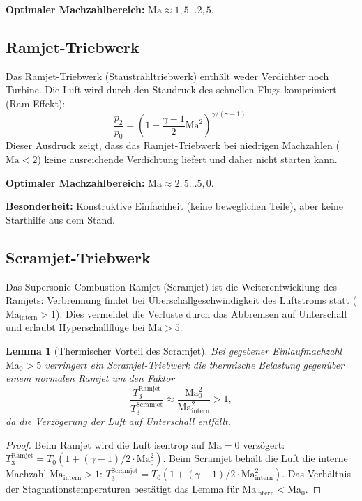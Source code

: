 ﻿\documentclass[12pt,a4paper]{article}
\newtheorem{lemma}[theorem]{Lemma}
\theoremstyle{remark}
\newcommand{\Ma}{\mathrm{Ma}}
\begin{document}
\textbf{Optimaler Machzahlbereich:} $\Ma \approx 1{,}5 \ldots 2{,}5$.

\subsection{Ramjet-Triebwerk}

Das Ramjet-Triebwerk (Staustrahltriebwerk) enth\"alt weder Verdichter noch Turbine.
Die Luft wird durch den Staudruck des schnellen Flugs komprimiert (Ram-Effekt):
\begin{equation}
  \frac{p_2}{p_0} = \left(1 + \frac{\gamma-1}{2}\Ma^2\right)^{\gamma/(\gamma-1)}.
  \label{eq:ram_pressure}
\end{equation}
Dieser Ausdruck zeigt, dass das Ramjet-Triebwerk bei niedrigen Machzahlen
($\Ma < 2$) keine ausreichende Verdichtung liefert und daher nicht starten kann.

\textbf{Optimaler Machzahlbereich:} $\Ma \approx 2{,}5 \ldots 5{,}0$.

\textbf{Besonderheit:} Konstruktive Einfachheit (keine beweglichen Teile),
aber keine Starthilfe aus dem Stand.

\subsection{Scramjet-Triebwerk}

Das Supersonic Combustion Ramjet (Scramjet) ist die Weiterentwicklung des Ramjets:
Verbrennung findet bei Überschallgeschwindigkeit des Luftstroms statt ($\Ma_{\mathrm{intern}} > 1$).
Dies vermeidet die Verluste durch das Abbremsen auf Unterschall
und erlaubt Hyperschallfl\"uge bei $\Ma > 5$.

\begin{lemma}[Thermischer Vorteil des Scramjet]
\label{lem:scramjet}
Bei gegebener Einlaufmachzahl $\Ma_0 > 5$ verringert ein Scramjet-Triebwerk
die thermische Belastung gegen\"uber einem normalen Ramjet um den Faktor
\[
  \frac{T_3^{\mathrm{Ramjet}}}{T_3^{\mathrm{Scramjet}}} \approx \frac{\Ma_0^2}{\Ma_{\mathrm{intern}}^2} > 1,
\]
da die Verz\"ogerung der Luft auf Unterschall entf\"allt.
\end{lemma}
\begin{proof}
Beim Ramjet wird die Luft isentrop auf $\Ma = 0$ verz\"ogert:
$T_3^{\mathrm{Ramjet}} = T_0 (1 + (\gamma-1)/2 \cdot \Ma_0^2)$.
Beim Scramjet beh\"alt die Luft die interne Machzahl $\Ma_{\mathrm{intern}} > 1$:
$T_3^{\mathrm{Scramjet}} = T_0 (1 + (\gamma-1)/2 \cdot \Ma_{\mathrm{intern}}^2)$.
Das Verh\"altnis der Stagnationstemperaturen best\"atigt das Lemma f\"ur $\Ma_{\mathrm{intern}} < \Ma_0$.
\end{proof}
\end{document}
